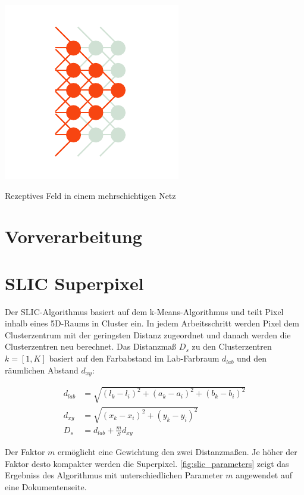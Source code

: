 \begin{marginfigure}
    \label{fig:cnn_neurons}
    \includegraphics[width=\textwidth]{figures/sketch/cnn/perceptive_field.pdf}
    \caption{Rezeptives Feld in einem mehrschichtigen Netz}
\end{marginfigure}

\qq{}


\section{Vorverarbeitung}

\section{SLIC Superpixel}
Der SLIC-Algorithmus basiert auf dem k-Means-Algorithmus und teilt Pixel inhalb eines 5D-Raums in Cluster ein. 
In jedem Arbeitsschritt werden Pixel dem Clusterzentrum mit der geringsten Distanz zugeordnet und danach werden die Clusterzentren neu berechnet.
Das Distanzmaß \(D_s\) zu den Clusterzentren \(k=[1,K]\) basiert auf den Farbabstand im Lab-Farbraum \(d_{lab}\) und den räumlichen Abstand \(d_{xy}\):

\begin{align}
    d_{lab} &= \sqrt{ \left( l_k - l_i \right)^2 + \left( a_k - a_i \right)^2 + \left( b_k - b_i \right)^2 }\\
    d_{xy}  &= \sqrt{ \left( x_k - x_i \right)^2 + \left(y_k - y_i \right)^2 }\\
    D_{s}   &= d_{lab} + \frac{m}{S} d_{xy}
\end{align}

Der Faktor \(m\) ermöglicht eine Gewichtung den zwei Distanzmaßen. Je höher
der Faktor desto kompakter werden die Superpixel. \cref{fig:slic_parameters}
zeigt das Ergebniss des Algorithmus mit unterschiedlichen Parameter  \(m\)
angewendet auf eine Dokumentenseite.
